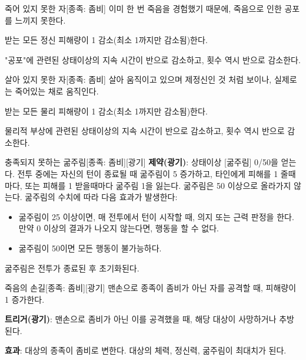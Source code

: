 \documentclass{report}
\begin{document}
	\begin{story}{죽어 있지 못한 자}{[종족: 좀비]}
		이미 한 번 죽음을 경험했기 때문에, 죽음으로 인한 공포를 느끼지 못한다.
		
		받는 모든 정신 피해량이 1 감소(최소 1까지만 감소됨)한다.
		
		"공포"에 관련된 상태이상의 지속 시간이 반으로 감소하고, 횟수 역시 반으로 감소한다.
		
		\smallskip
		
	\end{story}
	
	\begin{story}{살아 있지 못한 자}{[종족: 좀비]}
		살아 움직이고 있으며 제정신인 것 처럼 보이나, 실제로는 죽어있는 채로 움직인다.
		
		받는 모든 물리 피해량이 1 감소(최소 1까지만 감소됨)한다.
		
		물리적 부상에 관련된 상태이상의 지속 시간이 반으로 감소하고, 횟수 역시 반으로 감소한다.
		
	\end{story}
	
	\begin{story}{충족되지 못하는 굶주림}{[종족: 좀비][광기]}
		\textbf{제약(광기)}: 상태이상 [굶주림] 0/50을 얻는다. 전투 중에는 자신의 턴이 종료될 때 굶주림이 5 증가하고, 타인에게 피해를 1 줄때마다, 또는 피해를 1 받을때마다 굶주림 1을 잃는다. 굶주림은 50 이상으로 올라가지 않는다. 굶주림의 수치에 따라 다음 효과가 발생한다:
		\begin{itemize}
			\item 굶주림이 25 이상이면, 매 전투에서 턴이 시작할 때, 의지 또는 근력 판정을 한다. 만약 0 이상의 결과가 나오지 않는다면, 행동을 할 수 없다.
			\item 굶주림이 50이면 모든 행동이 불가능하다.
		\end{itemize}
		굶주림은 전투가 종료된 후 초기화된다.
		
	\end{story}
	
	\begin{story}{죽음의 손길}{[종족: 좀비][광기]}
		맨손으로 종족이 좀비가 아닌 자를 공격할 때, 피해량이 1 증가한다.
		
		\textbf{트리거(광기)}: 맨손으로 좀비가 아닌 이를 공격했을 때, 해당 대상이 사망하거나 추방된다.
		
		\textbf{효과}: 대상의 종족이 좀비로 변한다. 대상의 체력, 정신력, 굶주림이 최대치가 된다.
		
	\end{story}
\end{document}
